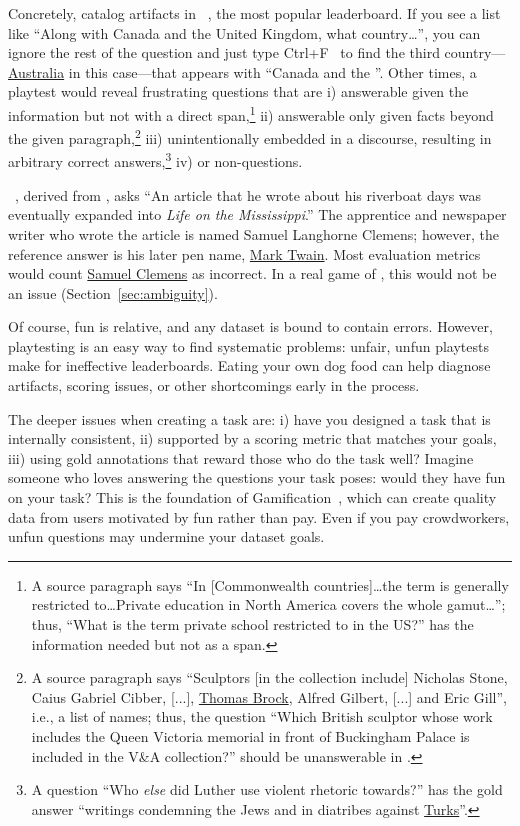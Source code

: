 Concretely,  catalog artifacts in \squad{}~\cite{rajpurkar-18}, the most popular  leaderboard.
If you see a list like ``Along with Canada and the United Kingdom, what country\dots'', you can ignore the rest of the question and just type Ctrl+F~\cite{yuan-19, russell-20} to find the third country---\underline{Australia} in this case---that appears with ``Canada and the ''.
Other times, a \squad{} playtest would reveal frustrating questions that are 
i) answerable given the information but not with a direct span,\footnote{A source paragraph says ``In [Commonwealth countries]\dots the term is generally restricted to\dots Private education in North America covers the whole gamut\dots''; thus, ``What is the term private school restricted to in the US?'' has the information needed but not as a span.}
ii) answerable only given facts beyond the given paragraph,\footnote{A source paragraph says ``Sculptors [in the collection include] Nicholas Stone, Caius Gabriel Cibber, [...], \underline{Thomas Brock}, Alfred Gilbert, [...] and Eric Gill'', i.e., a list of names; thus, the question ``Which British sculptor whose work includes the Queen Victoria memorial in front of Buckingham Palace is included in the V\&A collection?'' should be unanswerable in \squad{}.}
iii) unintentionally embedded in a discourse, resulting
in arbitrary correct answers,\footnote{A question ``Who \emph{else} did Luther use violent rhetoric towards?'' has the gold answer ``writings condemning the Jews and in diatribes against \underline{Turks}''.}
iv)  or non-questions.

\searchqa{}~\cite{dunn-17}, derived from \jeopardy{}, asks ``An article that he wrote about his riverboat days was eventually expanded into \textit{Life on the Mississippi}.''
The apprentice and newspaper writer who wrote the article is named Samuel Langhorne Clemens; however, the reference answer is his later pen name, \underline{Mark Twain}.
Most \qa{} evaluation metrics would count \underline{Samuel Clemens} as incorrect.
In a real game of \jeopardy{}, this would not be an issue (Section~\ref{sec:ambiguity}).

Of course, fun is relative, and any dataset is bound to contain errors.
However, playtesting is an easy way to find systematic problems: unfair, unfun playtests make for ineffective leaderboards.
Eating your own dog food can help diagnose artifacts, scoring issues, or other shortcomings early in the process.

The deeper issues when creating a  task are:
i) have you designed a task that is internally consistent,
ii) supported by a scoring metric that matches your goals,
iii) using gold annotations that reward those who do the task well?
Imagine someone who loves answering the questions your task poses: would they have fun on your task?
This is the foundation of Gamification~\cite{ahn-06}, which can create quality data from users motivated by fun rather than pay.
Even if you pay crowdworkers, unfun questions may undermine your dataset goals.

